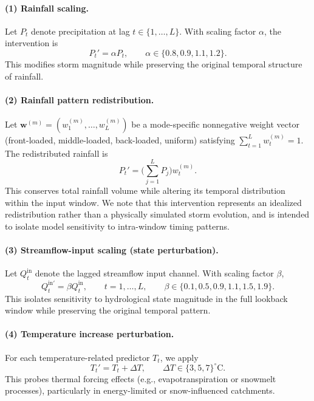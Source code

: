 \documentclass[11pt]{article}
\begin{document}
\paragraph{(1) Rainfall scaling.}
Let $P_t$ denote precipitation at lag $t\in\{1,\dots,L\}$. With scaling factor $\alpha$, the intervention is
\begin{equation}
    P_t' = \alpha P_t,
    \qquad
    \alpha\in\{0.8,0.9,1.1,1.2\}.
\end{equation}
This modifies storm magnitude while preserving the original temporal structure of rainfall\cite{nearing2021role}.

\paragraph{(2) Rainfall pattern redistribution.}
Let $\mathbf{w}^{(m)}=(w_1^{(m)},\dots,w_L^{(m)})$ be a mode-specific nonnegative weight vector (front-loaded, middle-loaded, back-loaded, uniform) satisfying $\sum_{t=1}^{L}w_t^{(m)}=1$. The redistributed rainfall is
\begin{equation}
    P_t' = \Big(\sum_{j=1}^{L}P_j\Big) w_t^{(m)}.
\end{equation}
This conserves total rainfall volume while altering its temporal distribution within the input window\cite{Wrr_p_q}. We note that this intervention represents an idealized redistribution rather than a physically simulated storm evolution, and is intended to isolate model sensitivity to intra-window timing patterns.

\paragraph{(3) Streamflow-input scaling (state perturbation).}
Let $Q_t^{\mathrm{in}}$ denote the lagged streamflow input channel. With scaling factor $\beta$,
\begin{equation}
    Q_t^{\mathrm{in}\prime} = \beta Q_t^{\mathrm{in}},
    \qquad t=1,\dots,L,
    \qquad
    \beta\in\{0.1,0.5,0.9,1.1,1.5,1.9\}.
\end{equation}
This isolates sensitivity to hydrological state magnitude in the full lookback window while preserving the original temporal pattern\cite{apak2026multi}.

\paragraph{(4) Temperature increase perturbation.}
For each temperature-related predictor $T_t$, we apply
\begin{equation}
    T_t' = T_t + \Delta T,
    \qquad
    \Delta T\in\{3,5,7\}^{\circ}\mathrm{C}.
\end{equation}
This probes thermal forcing effects (e.g., evapotranspiration or snowmelt processes), particularly in energy-limited or snow-influenced catchments\cite{milly2020colorado}.
\end{document}
